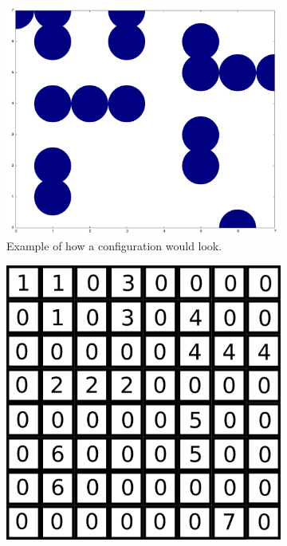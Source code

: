 \begin{figure}[h]
	\begin{center}
		\begin{subfigure}[t]{0.3\textwidth}
			\includegraphics[width = \textwidth]{fig/example.png}
			\caption{Example of how a configuration would look.}
			\label{fig:example}
		\end{subfigure}
		\begin{subfigure}[t]{0.3\textwidth}
			\includegraphics[width = \textwidth]{fig/num_grid_example.png}

\end{subfigure}
\end{center}
\end{figure}
